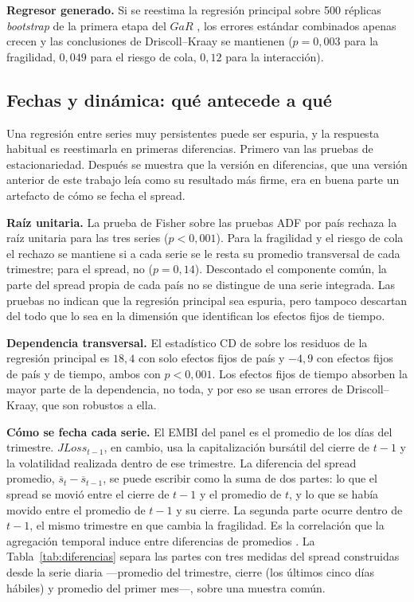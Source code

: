 \textbf{Regresor generado.} Si se reestima la regresión principal sobre 500 réplicas \textit{bootstrap} de la primera etapa del $GaR$ \citep{Pagan1984}, los errores estándar combinados apenas crecen y las conclusiones de Driscoll--Kraay se mantienen ($p=0{,}003$ para la fragilidad, $0{,}049$ para el riesgo de cola, $0{,}12$ para la interacción).

\subsection{Fechas y dinámica: qué antecede a qué}
\label{sec:estacionariedad}

Una regresión entre series muy persistentes puede ser espuria, y la respuesta habitual es reestimarla en primeras diferencias. Primero van las pruebas de estacionariedad. Después se muestra que la versión en diferencias, que una versión anterior de este trabajo leía como su resultado más firme, era en buena parte un artefacto de cómo se fecha el spread.

\textbf{Raíz unitaria.} La prueba de Fisher sobre las pruebas ADF por país \citep{MaddalaWu1999} rechaza la raíz unitaria para las tres series ($p<0{,}001$). Para la fragilidad y el riesgo de cola el rechazo se mantiene si a cada serie se le resta su promedio transversal de cada trimestre; para el spread, no ($p=0{,}14$). Descontado el componente común, la parte del spread propia de cada país no se distingue de una serie integrada. Las pruebas no indican que la regresión principal sea espuria, pero tampoco descartan del todo que lo sea en la dimensión que identifican los efectos fijos de tiempo.

\textbf{Dependencia transversal.} El estadístico CD de \citet{Pesaran2004} sobre los residuos de la regresión principal es $18{,}4$ con solo efectos fijos de país y $-4{,}9$ con efectos fijos de país y de tiempo, ambos con $p<0{,}001$. Los efectos fijos de tiempo absorben la mayor parte de la dependencia, no toda, y por eso se usan errores de Driscoll--Kraay, que son robustos a ella.

\textbf{Cómo se fecha cada serie.} El EMBI del panel es el promedio de los días del trimestre. $JLoss_{t-1}$, en cambio, usa la capitalización bursátil del cierre de $t-1$ y la volatilidad realizada dentro de ese trimestre. La diferencia del spread promedio, $\overline{s}_t-\overline{s}_{t-1}$, se puede escribir como la suma de dos partes: lo que el spread se movió entre el cierre de $t-1$ y el promedio de $t$, y lo que se había movido entre el promedio de $t-1$ y su cierre. La segunda parte ocurre dentro de $t-1$, el mismo trimestre en que cambia la fragilidad. Es la correlación que la agregación temporal induce entre diferencias de promedios \citep{Working1960}. La Tabla~\ref{tab:diferencias} separa las partes con tres medidas del spread construidas desde la serie diaria ---promedio del trimestre, cierre (los últimos cinco días hábiles) y promedio del primer mes---, sobre una muestra común.

